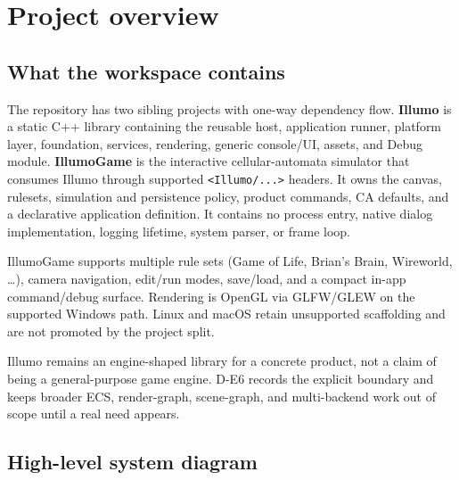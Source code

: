 \section{Project overview}
\label{sec:overview}

\subsection{What the workspace contains}
The repository has two sibling projects with one-way dependency flow.
\textbf{Illumo} is a static C++ library containing the reusable host,
application runner, platform layer, foundation, services, rendering, generic
console/UI, assets, and Debug module.
\textbf{IllumoGame} is the interactive cellular-automata simulator that consumes
Illumo through supported \texttt{<Illumo/...>} headers. It owns the canvas,
rulesets, simulation and persistence policy, product commands, CA defaults, and
a declarative application definition. It contains no process entry, native
dialog implementation, logging lifetime, system parser, or frame loop.

IllumoGame supports multiple rule sets (Game of Life, Brian's Brain,
Wireworld, \ldots), camera navigation, edit/run modes, save/load, and a compact
in-app command/debug surface. Rendering is OpenGL via GLFW/GLEW on the supported
Windows path. Linux and macOS retain unsupported scaffolding and are not
promoted by the project split.

\begin{inferencebox}
Illumo remains an engine-shaped library for a concrete product, not a claim of
being a general-purpose game engine. D-E6 records the explicit boundary and
keeps broader ECS, render-graph, scene-graph, and multi-backend work out of
scope until a real need appears.
\end{inferencebox}

\subsection{High-level system diagram}


